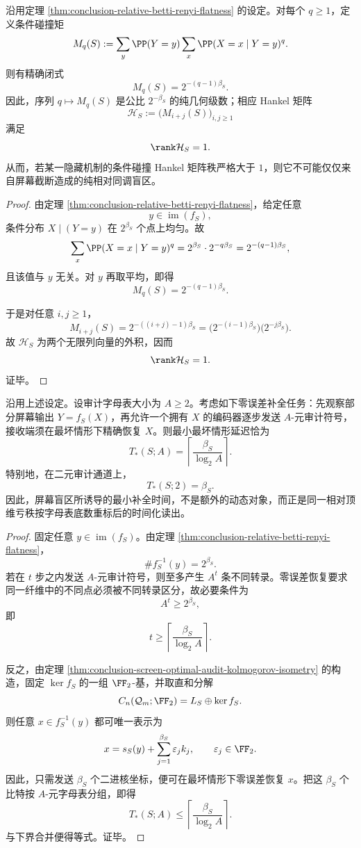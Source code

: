 \begin{theorem}\label{thm:conclusion-screen-collision-moment-hankel-rank-one}
沿用定理 \ref{thm:conclusion-relative-betti-renyi-flatness} 的设定。对每个 \(q\ge 1\)，定义条件碰撞矩
\[
M_q(S):=
\sum_{y}\PP(Y=y)\sum_x \PP(X=x\mid Y=y)^q.
\]
则有精确闭式
\[
M_q(S)=2^{-(q-1)\beta_S}.
\]
因此，序列 \(q\mapsto M_q(S)\) 是公比 \(2^{-\beta_S}\) 的纯几何级数；相应 Hankel 矩阵
\[
\mathcal H_S:=\bigl(M_{i+j}(S)\bigr)_{i,j\ge 1}
\]
满足
\[
\rank \mathcal H_S=1.
\]
从而，若某一隐藏机制的条件碰撞 Hankel 矩阵秩严格大于 \(1\)，则它不可能仅仅来自屏幕截断造成的纯相对同调盲区。
\end{theorem}

\begin{proof}
由定理 \ref{thm:conclusion-relative-betti-renyi-flatness}，给定任意
\[
y\in \operatorname{im}(f_S),
\]
条件分布 \(X\mid(Y=y)\) 在 \(2^{\beta_S}\) 个点上均匀。故
\[
\sum_x \PP(X=x\mid Y=y)^q
=
2^{\beta_S}\cdot 2^{-q\beta_S}
=
2^{-(q-1)\beta_S},
\]
且该值与 \(y\) 无关。对 \(y\) 再取平均，即得
\[
M_q(S)=2^{-(q-1)\beta_S}.
\]

于是对任意 \(i,j\ge 1\)，
\[
M_{i+j}(S)
=
2^{-((i+j)-1)\beta_S}
=
\bigl(2^{-(i-1)\beta_S}\bigr)\bigl(2^{-j\beta_S}\bigr).
\]
故 \(\mathcal H_S\) 为两个无限列向量的外积，因而
\[
\rank \mathcal H_S=1.
\]
证毕。
\end{proof}

\begin{theorem}[零误差审计时间的精确公式]\label{thm:conclusion-screen-zeroerror-audit-time}
沿用上述设定。设审计字母表大小为 \(A\ge 2\)。考虑如下零误差补全任务：先观察部分屏幕输出 \(Y=f_S(X)\)，再允许一个拥有 \(X\) 的编码器逐步发送 \(A\)-元审计符号，接收端须在最坏情形下精确恢复 \(X\)。则最小最坏情形延迟恰为
\[
T_\ast(S;A)=\left\lceil \frac{\beta_S}{\log_2 A}\right\rceil.
\]
特别地，在二元审计通道上，
\[
T_\ast(S;2)=\beta_S.
\]
因此，屏幕盲区所诱导的最小补全时间，不是额外的动态对象，而正是同一相对顶维亏秩按字母表底数重标后的时间化读出。
\end{theorem}

\begin{proof}
固定任意 \(y\in \operatorname{im}(f_S)\)。由定理 \ref{thm:conclusion-relative-betti-renyi-flatness}，
\[
\#f_S^{-1}(y)=2^{\beta_S}.
\]
若在 \(t\) 步之内发送 \(A\)-元审计符号，则至多产生 \(A^t\) 条不同转录。零误差恢复要求同一纤维中的不同点必须被不同转录区分，故必要条件为
\[
A^t\ge 2^{\beta_S},
\]
即
\[
t\ge \left\lceil \frac{\beta_S}{\log_2 A}\right\rceil.
\]

反之，由定理 \ref{thm:conclusion-screen-optimal-audit-kolmogorov-isometry} 的构造，固定 \(\ker f_S\) 的一组 \(\FF_2\)-基，并取直和分解
\[
C_n(\mathcal Q_m;\FF_2)=L_S\oplus \ker f_S.
\]
则任意 \(x\in f_S^{-1}(y)\) 都可唯一表示为
\[
x=s_S(y)+\sum_{j=1}^{\beta_S}\varepsilon_j k_j,
\qquad
\varepsilon_j\in \FF_2.
\]
因此，只需发送 \(\beta_S\) 个二进核坐标，便可在最坏情形下零误差恢复 \(x\)。把这 \(\beta_S\) 个比特按 \(A\)-元字母表分组，即得
\[
T_\ast(S;A)\le \left\lceil \frac{\beta_S}{\log_2 A}\right\rceil.
\]
与下界合并便得等式。证毕。
\end{proof}

